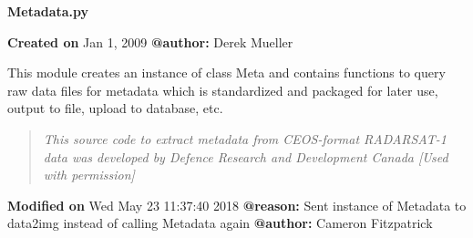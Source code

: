 \documentclass[letterpaper,10pt,openany,oneside]{sphinxmanual}
\begin{document}
\label{code:module-Metadata}
\textbf{Metadata.py}

\textbf{Created on} Jan 1, 2009 \textbf{@author:} Derek Mueller

This module creates an instance of class Meta and contains functions to
query raw data files for metadata which is standardized and packaged for
later use, output to file, upload to database, etc.
\begin{quote}

\emph{This source code to extract metadata from CEOS-format RADARSAT-1 
data was developed by Defence Research and Development Canada
{[}Used with permission{]}}
\end{quote}

\textbf{Modified on} Wed May  23 11:37:40 2018 \textbf{@reason:} Sent instance of Metadata to data2img instead of calling Metadata again \textbf{@author:} Cameron Fitzpatrick
\end{document}

